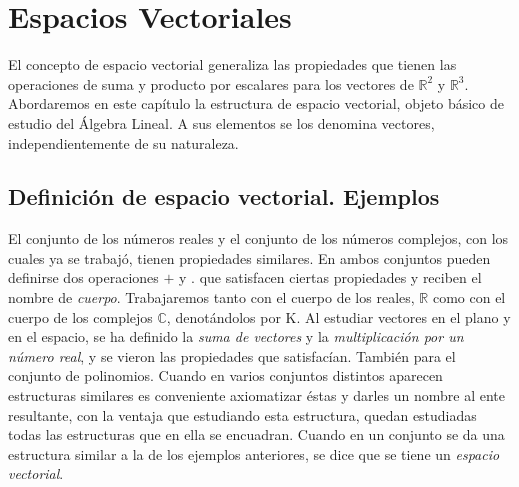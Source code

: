 \chapter{Espacios Vectoriales}

El concepto de espacio vectorial generaliza las propiedades que tienen las operaciones de suma y producto por escalares  para los vectores de $\mathbb{R}^2$ y $\mathbb{R}^3$. Abordaremos en este capítulo la estructura de espacio vectorial, objeto básico de estudio del Álgebra Lineal. A sus elementos se los denomina vectores, independientemente de su naturaleza.

\bigskip


\section{Definición de espacio vectorial. Ejemplos  }\label{intro}


El conjunto de los números reales y el conjunto de los números complejos, con los cuales ya se trabajó, tienen propiedades similares. En ambos conjuntos pueden definirse dos operaciones $+$ y $.$ que satisfacen ciertas propiedades y reciben el nombre de  \textit{cuerpo}. Trabajaremos tanto con el cuerpo de los reales,  $\mathbb{R}$ como con el cuerpo de los complejos  $\mathbb{C}$, denotándolos por K.
Al estudiar vectores en el plano y en el espacio, se ha definido la \textit{suma de vectores} y la \textit{multiplicación por un número real}, y se vieron las propiedades que satisfacían. También para el conjunto de polinomios. 
Cuando en varios conjuntos distintos aparecen estructuras similares es conveniente axiomatizar éstas y darles un nombre al ente resultante, con la ventaja que estudiando esta estructura, quedan estudiadas todas las estructuras que en ella se encuadran. Cuando en un conjunto se da una estructura similar a la de los ejemplos anteriores, se dice que se tiene un \textit{espacio vectorial}.

\bigskip

\bigskip
 

\bigskip


